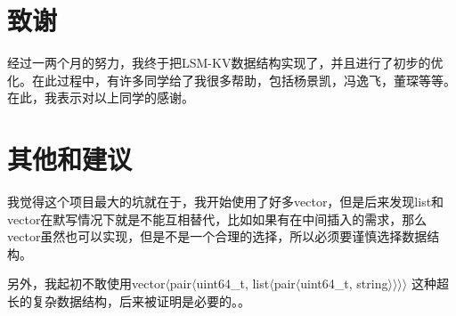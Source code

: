 \documentclass{article}
\begin{document}
\section{致谢}


经过一两个月的努力，我终于把LSM-KV数据结构实现了，并且进行了初步的优化。在此过程中，有许多同学给了我很多帮助，包括杨景凯，冯逸飞，董琛等等。在此，我表示对以上同学的感谢。



\section{其他和建议}
我觉得这个项目最大的坑就在于，我开始使用了好多vector，但是后来发现list和vector在默写情况下就是不能互相替代，比如如果有在中间插入的需求，那么vector虽然也可以实现，但是不是一个合理的选择，所以必须要谨慎选择数据结构。

另外，我起初不敢使用vector$\langle$pair$\langle$uint64\_t, list$\langle$pair$\langle$uint64\_t, string$\rangle$$\rangle$$\rangle$$\rangle$ 这种超长的复杂数据结构，后来被证明是必要的。。
\end{document}
